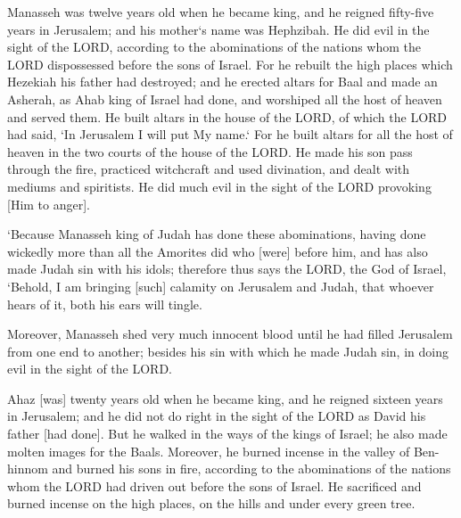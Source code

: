 \begin{scripture}[2 Kings 21:1-6]
    Manasseh was twelve years old when he became king, and he reigned fifty-five years in Jerusalem; and his mother`s name was Hephzibah.
    He did evil in the sight of the LORD, according to the abominations of the nations whom the LORD dispossessed before the sons of Israel.
    For he rebuilt the high places which Hezekiah his father had destroyed; and he erected altars for Baal and made an Asherah, as Ahab king of Israel had done, and worshiped all the host of heaven and served them.
    He built altars in the house of the LORD, of which the LORD had said, `In Jerusalem I will put My name.`
    For he built altars for all the host of heaven in the two courts of the house of the LORD.
    He made his son pass through the fire, practiced witchcraft and used divination, and dealt with mediums and spiritists. He did much evil in the sight of the LORD provoking [Him to anger].
\end{scripture}

\begin{scripture}[2 Kings 21:11-12]
    `Because Manasseh king of Judah has done these abominations, having done wickedly more than all the Amorites did who [were] before him, and has also made Judah sin with his idols;
    therefore thus says the LORD, the God of Israel, `Behold, I am bringing [such] calamity on Jerusalem and Judah, that whoever hears of it, both his ears will tingle.
\end{scripture}

\begin{scripture}[2 Kings 21:16]
    Moreover, Manasseh shed very much innocent blood until he had filled Jerusalem from one end to another; besides his sin with which he made Judah sin, in doing evil in the sight of the LORD.
\end{scripture}

\begin{scripture}[2 Chronicles 28:1-4]
    Ahaz [was] twenty years old when he became king, and he reigned sixteen years in Jerusalem; and he did not do right in the sight of the LORD as David his father [had done].
    But he walked in the ways of the kings of Israel; he also made molten images for the Baals.
    Moreover, he burned incense in the valley of Ben-hinnom and burned his sons in fire, according to the abominations of the nations whom the LORD had driven out before the sons of Israel.
    He sacrificed and burned incense on the high places, on the hills and under every green tree.
\end{scripture}

